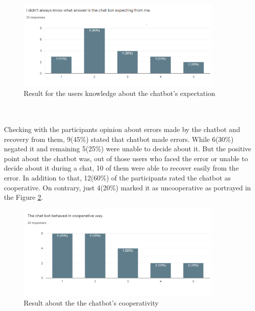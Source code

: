 \begin{figure}[!h]
    \centering
    \includegraphics[width=0.9\textwidth]{img/Answer_Expect.PNG}
    \caption{Result for the users knowledge about the chatbot's expectation}
    \label{fig:ansExpec}
\end{figure}
\\~\\
Checking with the participants opinion about errors made by the chatbot and recovery from them, 9(45\%) stated that chatbot made errors. While 6(30\%) negated it and remaining 5(25\%) were unable to decide about it. But the positive point about the chatbot was, out of those users who faced the error or unable to decide about it during a chat, 10 of them were able to recover easily from the error. In addition to that, 12(60\%) of the participants rated the chatbot as cooperative. On contrary, just 4(20\%) marked it as uncooperative as portrayed in the Figure \ref{fig:cooperBot}.

\begin{figure}[!h]
    \centering
    \includegraphics[width=0.9\textwidth]{img/Cooperative_Chatbot.PNG}
    \caption{Result about the the chatbot's cooperativity}
    \label{fig:cooperBot}
\end{figure}

